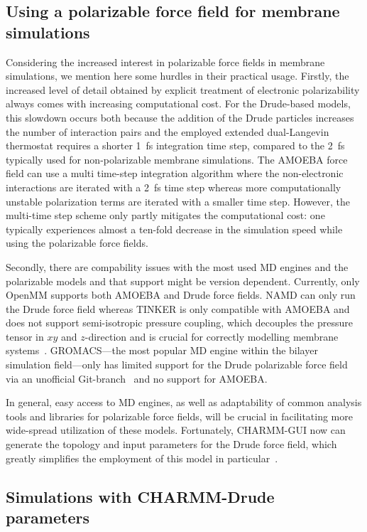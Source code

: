 \documentclass[journal=jacsat,manuscript=article,layout=singlecolumn]{achemso}
\begin{document}
\subsection{Using a polarizable force field for membrane simulations}

Considering the increased interest in polarizable force fields in membrane simulations, we mention here some hurdles in their practical usage. Firstly, the increased level of detail obtained by explicit treatment of electronic polarizability always comes with increasing computational cost. For the Drude-based models, this slowdown occurs both because the addition of the Drude particles increases the number of interaction pairs and the employed extended dual-Langevin thermostat requires a shorter 1~fs integration time step, compared to the 2~fs typically used for non-polarizable membrane simulations. The AMOEBA force field can use a multi time-step integration algorithm where the non-electronic interactions are iterated with a 2~fs time step whereas more computationally unstable polarization terms are iterated with a smaller time step. However, the multi-time step scheme  only partly mitigates the computational cost: one typically experiences almost a ten-fold decrease in the simulation speed while using the polarizable force fields. 

Secondly, there are compability issues with the most used MD engines and the polarizable models and that support might be version dependent. Currently, only OpenMM supports both AMOEBA and Drude force fields. NAMD can only run the Drude force field whereas TINKER is only compatible with AMOEBA and does not support semi-isotropic pressure coupling, which decouples the pressure tensor in $xy$ and $z$-direction and is crucial for correctly modelling membrane systems~\cite{xxx}. GROMACS---the most popular MD engine within the bilayer simulation field---only has limited support for the Drude polarizable force field via an unofficial Git-branch~\cite{drudegithub} and no support for AMOEBA. 

In general, easy access to MD engines, as well as adaptability of common analysis tools and libraries for polarizable force fields, will be crucial in facilitating more wide-spread utilization of these models. Fortunately, CHARMM-GUI now can generate the topology and input parameters for the Drude force field, which greatly simplifies the employment of this model in particular~\cite{kognole2022charmm}.

\subsection{Simulations with CHARMM-Drude parameters}
\end{document}
